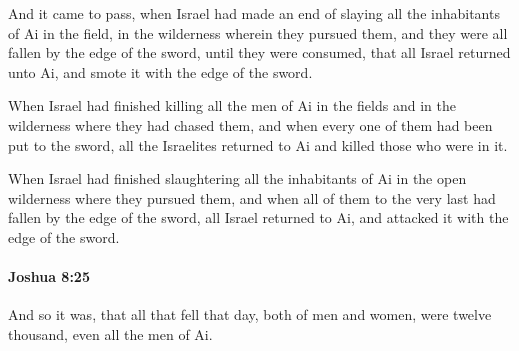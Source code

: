 			\begin{versebox}
					\item[BHS] 
					\item[ASV] And it came to pass, when Israel had made an end of slaying all the inhabitants of Ai in the field, in the wilderness wherein they pursued them, and they were all fallen by the edge of the sword, until they were consumed, that all Israel returned unto Ai, and smote it with the edge of the sword.
					\item[NIV] When Israel had finished killing all the men of Ai in the fields and in the wilderness where they had chased them, and when every one of them had been put to the sword, all the Israelites returned to Ai and killed those who were in it.
					\item[NRSV] When Israel had finished slaughtering all the inhabitants of Ai in the open wilderness where they pursued them, and when all of them to the very last had fallen by the edge of the sword, all Israel returned to Ai, and attacked it with the edge of the sword.
			\end{versebox}

		\paragraph{Joshua 8:25} %
			\label{JOSHUA-8-25}

			And so it was, that all that fell that day, both of men and women, were twelve thousand, even all the men of Ai.

